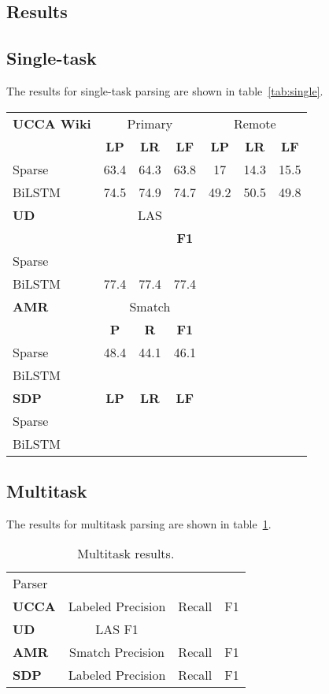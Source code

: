 \documentclass[11pt,a4paper]{article}
\begin{document}
\subsection{Results}\label{sec:results}

\subsection{Single-task}\label{sec:results_single}

The results for single-task parsing are shown in table~\ref{tab:single}.



\begin{table*}
\begin{tabular}{lccc|ccc}
\textbf{UCCA Wiki}
& \multicolumn{3}{c|}{Primary} & \multicolumn{3}{c}{Remote} \\
& \textbf{LP} & \textbf{LR} & \textbf{LF} & \textbf{LP} & \textbf{LR} & \textbf{LF} \\
\hline
Sparse & 63.4 & 64.3 & 63.8 & 17 & 14.3 & 15.5 \\
BiLSTM & 74.5 & 74.9 & 74.7 & 49.2 & 50.5 & 49.8 \\
\hline
\textbf{UD} & \multicolumn{3}{c|}{LAS} \\
& & & \textbf{F1} \\
Sparse & & & \\
BiLSTM & 77.4 & 77.4 & 77.4 \\
\hline
\textbf{AMR} & \multicolumn{3}{c|}{Smatch} \\
& \textbf{P} & \textbf{R} & \textbf{F1} \\
Sparse & 48.4 & 44.1 & 46.1 \\
BiLSTM & & & \\
\hline
\textbf{SDP} & \textbf{LP} & \textbf{LR} & \textbf{LF} \\
Sparse & & & \\
BiLSTM & & &
\end{tabular}
\caption{Single-task results on each dev set.\label{tab:single}}
\end{table*}

\subsection{Multitask}\label{sec:results_multi}

The results for multitask parsing are shown in table~\ref{tab:multi}.

\begin{table}
\begin{tabular}{lccc}
Parser \\
\textbf{UCCA} & Labeled Precision & Recall & F1 \\
\textbf{UD} & LAS F1 \\
\textbf{AMR} & Smatch Precision & Recall & F1 \\
\textbf{SDP} & Labeled Precision & Recall & F1 \\
\end{tabular}
\caption{Multitask results.\label{tab:multi}}
\end{table}
\end{document}
